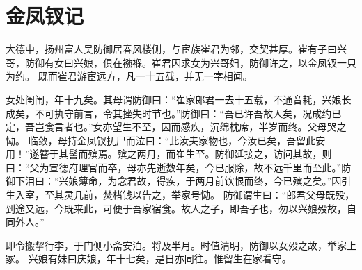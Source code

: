 \documentclass[a4paper,12pt,UTF8,twoside]{ctexbook}
\begin{document}
\chapter{金凤钗记}

大德中，扬州富人吴防御居春风楼侧，与宦族崔君为邻，交契甚厚。崔有子曰兴哥，防御有女曰兴娘，俱在襁褓。崔君因求女为兴哥妇，防御许之，以金凤钗一只为约。 既而崔君游宦远方，凡一十五载，并无一字相闻。

女处闺闱，年十九矣。其母谓防御曰：“崔家郎君一去十五载，不通音耗，兴娘长成矣，不可执守前言，令其挫失时节也。”防御曰：“吾已许吾故人矣，况成约已定，吾岂食言者也。”女亦望生不至，因而感疾，沉绵枕席，半岁而终。父母哭之恸。 临敛，母持金凤钗抚尸而泣曰：“此汝夫家物也，今汝已矣，吾留此安用！”遂簪于其髻而殡焉。殡之两月，而崔生至。防御延接之，访问其故，则曰：“父为宣德府理官而卒，母亦先逝数年矣，今已服除，故不远千里而至此。”防御下泪曰：“兴娘薄命，为念君故，得疾，于两月前饮恨而终，今已殡之矣。”因引生入室，至其灵几前，焚楮钱以告之，举家号恸。 防御谓生曰：“郎君父母既殁，到途又远，今既来此，可便于吾家宿食。故人之子，即吾子也，勿以兴娘殁故，自同外人。”

即令搬挈行李，于门侧小斋安泊。将及半月。时值清明，防御以女殁之故，举家上冢。 兴娘有妹曰庆娘，年十七矣，是日亦同往。惟留生在家看守。
\end{document}
